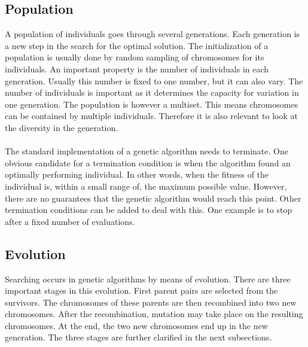 \subsection{Population}
A population of individuals goes through several generations. Each generation
is a new step in the search for the optimal solution. The initialization of a
population is usually done by random sampling of chromosomes for its
individuals. An important property is the number of individuals in each
generation. Usually this number is fixed to one number, but it can also vary.
The number of individuals is important as it determines the capacity for
variation in one generation. The population is however a multiset. This means
chromosomes can be contained by multiple individuals. Therefore it is also
relevant to look at the diversity in the generation.\\\\
\noindent
The standard implementation of a genetic algorithm needs to terminate. One
obvious candidate for a termination condition is when the algorithm found an
optimally performing individual. In other words, when the fitness of the
individual is, within a small range of, the maximum possible value. However,
there are no guarantees that the genetic algorithm would reach this point.
Other termination conditions can be added to deal with this. One example is to
stop after a fixed number of evaluations.
\subsection{Evolution}
\label{sec:approach_intro_evolution}
Searching occurs in genetic algorithms by means of evolution. There are three
important stages in this evolution. First parent pairs are selected from the
survivors. The chromosomes of these parents are then recombined into two new
chromosomes. After the recombination, mutation may take place on the resulting
chromosomes. At the end, the two new chromosomes end up in the new generation.
The three stages are further clarified in the next subsections.
